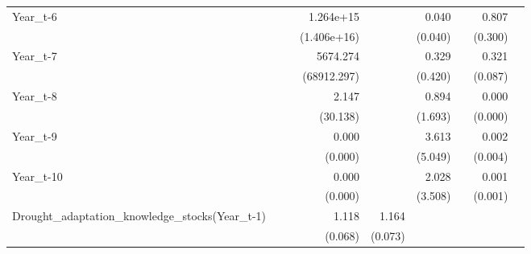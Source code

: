 \begin{table}[htbp]
\begin{tabular}{l*{8}{D{.}{.}{-1}}}
Year\_t-6    &                     &                     &   1.264e+15\sym{***}&                     &       0.040\sym{***}&                     &       0.807         &                     \\
            &                     &                     & (1.406e+16)         &                     &     (0.040)         &                     &     (0.300)         &                     \\
Year\_t-7    &                     &                     &    5674.274         &                     &       0.329         &                     &       0.321\sym{***}&                     \\
            &                     &                     & (68912.297)         &                     &     (0.420)         &                     &     (0.087)         &                     \\
Year\_t-8    &                     &                     &       2.147         &                     &       0.894         &                     &       0.000\sym{***}&                     \\
            &                     &                     &    (30.138)         &                     &     (1.693)         &                     &     (0.000)         &                     \\
Year\_t-9    &                     &                     &       0.000         &                     &       3.613         &                     &       0.002\sym{***}&                     \\
            &                     &                     &     (0.000)         &                     &     (5.049)         &                     &     (0.004)         &                     \\
Year\_t-10   &                     &                     &       0.000         &                     &       2.028         &                     &       0.001\sym{***}&                     \\
            &                     &                     &     (0.000)         &                     &     (3.508)         &                     &     (0.001)         &                     \\
Drought\_adaptation\_knowledge\_stocks(Year\_t-1)&                     &                     &       1.118\sym{*}  &       1.164\sym{**} &                     &                     &                     &                     \\
            &                     &                     &     (0.068)         &     (0.073)         &                     &                     &                     &                     \\

\end{tabular}
\end{table}
